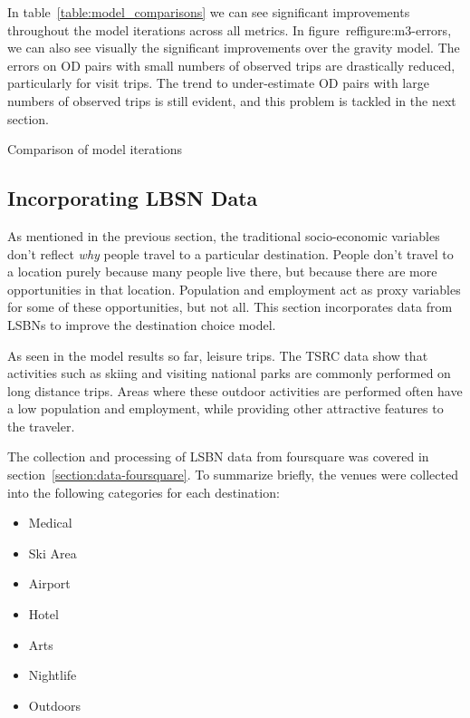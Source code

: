 In table~\ref{table:model_comparisons} we can see significant improvements throughout the model iterations across all metrics. In figure~ref{figure:m3-errors}, we can also see visually the significant improvements over the gravity model. The errors on OD pairs with small numbers of observed trips are drastically reduced, particularly for visit trips. The trend to under-estimate OD pairs with large numbers of observed trips is still evident, and this problem is tackled in the next section. 

\begin{table}[H]
\centering
\caption{Comparison of model iterations}
\label{table:model_comparisons}


\end{table}

\subsection{Incorporating LBSN Data}

As mentioned in the previous section, the traditional socio-economic variables don't reflect \textit{why} people travel to a particular destination. People don't travel to a location purely because many people live there, but because there are more opportunities in that location. Population and employment act as proxy variables for some of these opportunities, but not all. This section incorporates data from LSBNs to improve the destination choice model.  

As seen in the model results so far, leisure trips. The TSRC data show that activities such as skiing and visiting national parks are commonly performed on long distance trips. Areas where these outdoor activities are performed often have a low population and employment, while providing other attractive features to the traveler.

The collection and processing of LSBN data from foursquare was covered in section~\ref{section:data-foursquare}. To summarize briefly, the venues were collected into the following categories for each destination:
\begin{multicols}{2}
\raggedcolumns
\begin{itemize}
\item Medical
\item Ski Area
\item Airport
\item Hotel
\item Arts
\item Nightlife
\item Outdoors
\end{itemize}
\end{multicols}

